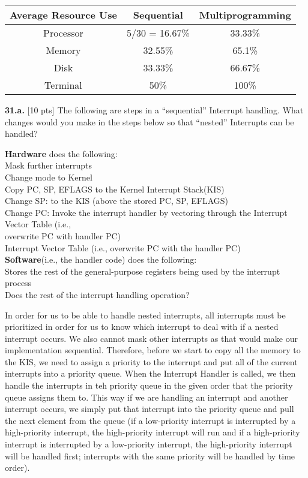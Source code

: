 \documentclass[12pt]{article}
\newcommand\tab[1][1cm]{\hspace*{#1}}
\begin{document}
\begin{center}
\begin{tabular}{| c || c | c |}
\hline
Average Resource Use & Sequential & Multiprogramming\\
\hline\hline
Processor & 5/30 = 16.67\% & 33.33\%\\
\hline
Memory & 32.55\% & 65.1\%\\
\hline
Disk & 33.33\% & 66.67\%\\
\hline
Terminal & 50\% & 100\%\\
\hline
\end{tabular}
\end{center}

\bigskip

{\bf 31.a.} [10 pts] The following are steps in a “sequential” Interrupt handling. What changes would you make in the steps below so that “nested” Interrupts can be handled?

\noindent
{\bf Hardware} does the following:\\
\tab Mask further interrupts\\
\tab Change mode to Kernel\\
\tab Copy PC, SP, EFLAGS to the Kernel Interrupt Stack(KIS)\\
\tab Change SP: to the KIS (above the stored PC, SP, EFLAGS)\\
\tab Change PC: Invoke the interrupt handler by vectoring through the Interrupt Vector Table (i.e.,\\ \tab overwrite PC with handler PC)\\
\tab Interrupt Vector Table (i.e., overwrite PC with the handler PC)\\

\noindent
{\bf Software}(i.e., the handler code) does the following:\\
\tab Stores the rest of the general-purpose registers being used by the interrupt process\\
\tab Does the rest of the interrupt handling operation? 

In order for us to be able to handle nested interrupts, all interrupts must be prioritized in order for us to know which interrupt to deal with if a nested interrupt occurs. We also cannot mask other interrupts as that would make our implementation sequential. Therefore, before we start to copy all the memory to the KIS, we need to assign a priority to the interrupt and put all of the current interrupts into a priority queue. When the Interrupt Handler is called, we then handle the interrupts in teh priority queue in the given order that the priority queue assigns them to. This way if we are handling an interrupt and another interrupt occurs, we simply put that interrupt into the priority queue and pull the next element from the queue (if a low-priority interrupt is interrupted by a high-priority interrupt, the high-priority interrupt will run and if a high-priority interrupt is interrupted by a low-priority interrupt, the high-priority interrupt will be handled first; interrupts with the same priority will be handled by time order). 
\end{document}
